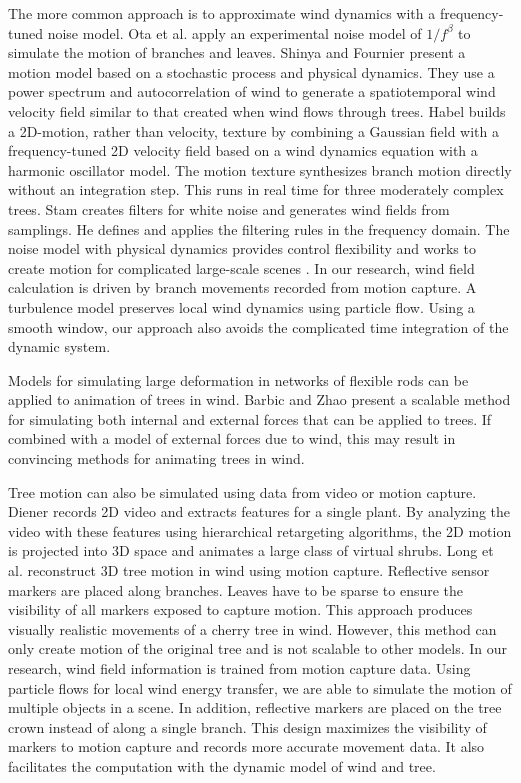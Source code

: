 The more common approach is to approximate wind dynamics with a frequency-tuned noise model. Ota et al. \cite{ota:cgi03} apply an experimental noise model of ${1/f^\beta}$ to simulate the motion of branches and leaves. Shinya and Fournier \cite{shinya:eu92} present a motion model based on a stochastic process and physical dynamics. They use a power spectrum and autocorrelation of wind to generate a spatiotemporal wind velocity field similar to that created when wind flows through trees. Habel \cite{Habel09PGT} builds a 2D-motion, rather than velocity, texture by combining a Gaussian field with a frequency-tuned 2D velocity field based on a wind dynamics equation with a harmonic oscillator model. The motion texture synthesizes branch motion directly without an integration step. This runs in real time for three moderately complex trees. Stam \cite{stams:eu97} creates filters for white noise and generates wind fields from samplings. He defines and applies the filtering rules in the frequency domain. The noise model with physical dynamics provides control flexibility and works to create motion for complicated large-scale scenes \cite{ZhangSTCP06}. In our research, wind field calculation is driven by branch movements recorded from motion capture. A turbulence model preserves local wind dynamics using particle flow. Using a smooth window, our approach also avoids the complicated time integration of the dynamic system.

Models for simulating large deformation in networks of flexible rods can be applied to animation of trees in wind. Barbic and Zhao \cite{Barbic:2011:RLS} present a scalable method for simulating both internal and external forces that can be applied to trees. If combined with a model of external forces due to wind, this may result in convincing methods for animating trees in wind.  

Tree motion can also be simulated using data from video or motion capture. Diener \cite{Diener:2006} records 2D video and extracts features for a single plant. By analyzing the video with these features using hierarchical retargeting algorithms, the 2D motion is projected into 3D space and animates a large class of virtual shrubs.  Long et al. \cite{Long:MCN2010} reconstruct 3D tree motion in wind using motion capture. Reflective sensor markers are placed along branches. Leaves have to be sparse to ensure the visibility of all markers exposed to capture motion. This approach produces visually realistic movements of a cherry tree in wind. However, this method can only create motion of the original tree and is not scalable to other models. In our research, wind field information is trained from motion capture data. Using particle flows for local wind energy transfer, we are able to simulate the motion of multiple objects in a scene. In addition, reflective markers are placed on the tree crown instead of along a single branch. This design maximizes the visibility of markers to motion capture and records more accurate movement data. It also facilitates the computation with the dynamic model of wind and tree.

